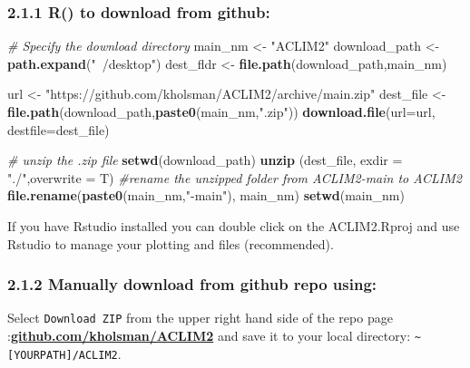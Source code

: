 \documentclass[
]{article}
\newenvironment{Shaded}{\begin{snugshade}}{\end{snugshade}}
\newcommand{\CommentTok}[1]{\textcolor[rgb]{0.56,0.35,0.01}{\textit{#1}}}
\newcommand{\DataTypeTok}[1]{\textcolor[rgb]{0.13,0.29,0.53}{#1}}
\newcommand{\KeywordTok}[1]{\textcolor[rgb]{0.13,0.29,0.53}{\textbf{#1}}}
\newcommand{\NormalTok}[1]{#1}
\newcommand{\StringTok}[1]{\textcolor[rgb]{0.31,0.60,0.02}{#1}}
\begin{document}
\hypertarget{r-to-download-from-github}{%
\subsubsection{2.1.1 R() to download from
github:}\label{r-to-download-from-github}}

\begin{Shaded}
\begin{Highlighting}[]
    \CommentTok{# Specify the download directory}
\NormalTok{    main_nm       <-}\StringTok{ "ACLIM2"}
\NormalTok{    download_path <-}\StringTok{ }\KeywordTok{path.expand}\NormalTok{(}\StringTok{"~/desktop"}\NormalTok{)}
\NormalTok{    dest_fldr     <-}\StringTok{ }\KeywordTok{file.path}\NormalTok{(download_path,main_nm)}
    
\NormalTok{    url           <-}\StringTok{ "https://github.com/kholsman/ACLIM2/archive/main.zip"}
\NormalTok{    dest_file     <-}\StringTok{ }\KeywordTok{file.path}\NormalTok{(download_path,}\KeywordTok{paste0}\NormalTok{(main_nm,}\StringTok{".zip"}\NormalTok{))}
    \KeywordTok{download.file}\NormalTok{(}\DataTypeTok{url=}\NormalTok{url, }\DataTypeTok{destfile=}\NormalTok{dest_file)}
    
    \CommentTok{# unzip the .zip file}
    \KeywordTok{setwd}\NormalTok{(download_path)}
    \KeywordTok{unzip}\NormalTok{ (dest_file, }\DataTypeTok{exdir =} \StringTok{"./"}\NormalTok{,}\DataTypeTok{overwrite =}\NormalTok{ T)}
    \CommentTok{#rename the unzipped folder from ACLIM2-main to ACLIM2}
    \KeywordTok{file.rename}\NormalTok{(}\KeywordTok{paste0}\NormalTok{(main_nm,}\StringTok{"-main"}\NormalTok{), main_nm)}
    \KeywordTok{setwd}\NormalTok{(main_nm)}
\end{Highlighting}
\end{Shaded}

If you have Rstudio installed you can double click on the ACLIM2.Rproj
and use Rstudio to manage your plotting and files (recommended).

\hypertarget{manually-download-from-github-repo-using}{%
\subsubsection{2.1.2 Manually download from github repo
using:}\label{manually-download-from-github-repo-using}}

Select \texttt{Download\ ZIP} from the upper right hand side of the repo
page
:\href{https://github.com/kholsman/ACLIM2}{\textbf{github.com/kholsman/ACLIM2}}
and save it to your local directory:
\texttt{\textasciitilde{}{[}YOURPATH{]}/ACLIM2}.
\end{document}
